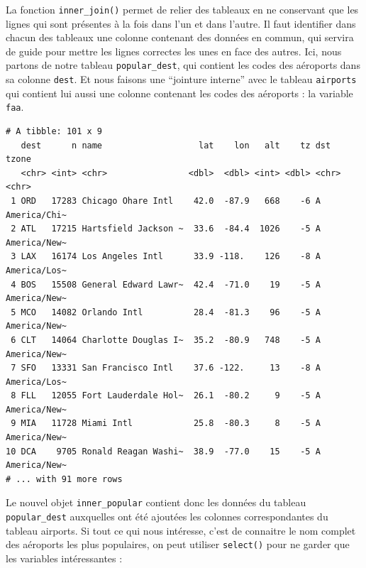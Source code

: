 \documentclass[a4paperpaper,]{article}
\newenvironment{Shaded}{\begin{snugshade}}{\end{snugshade}}
\newcommand{\KeywordTok}[1]{\textcolor[rgb]{0.13,0.29,0.53}{\textbf{#1}}}
\newcommand{\DataTypeTok}[1]{\textcolor[rgb]{0.13,0.29,0.53}{#1}}
\newcommand{\StringTok}[1]{\textcolor[rgb]{0.31,0.60,0.02}{#1}}
\newcommand{\OperatorTok}[1]{\textcolor[rgb]{0.81,0.36,0.00}{\textbf{#1}}}
\newcommand{\NormalTok}[1]{#1}
\theoremstyle{definition}
\theoremstyle{definition}
\theoremstyle{definition}
\theoremstyle{remark}
\begin{document}
La fonction \texttt{inner\_join()} permet de relier des tableaux en ne
conservant que les lignes qui sont présentes à la fois dans l'un et dans
l'autre. Il faut identifier dans chacun des tableaux une colonne
contenant des données en commun, qui servira de guide pour mettre les
lignes correctes les unes en face des autres. Ici, nous partons de notre
tableau \texttt{popular\_dest}, qui contient les codes des aéroports
dans sa colonne \texttt{dest}. Et nous faisons une ``jointure interne''
avec le tableau \texttt{airports} qui contient lui aussi une colonne
contenant les codes des aéroports : la variable \texttt{faa}.

\begin{Shaded}
\end{Shaded}

\begin{verbatim}
# A tibble: 101 x 9
   dest      n name                   lat    lon   alt    tz dst   tzone       
   <chr> <int> <chr>                <dbl>  <dbl> <int> <dbl> <chr> <chr>       
 1 ORD   17283 Chicago Ohare Intl    42.0  -87.9   668    -6 A     America/Chi~
 2 ATL   17215 Hartsfield Jackson ~  33.6  -84.4  1026    -5 A     America/New~
 3 LAX   16174 Los Angeles Intl      33.9 -118.    126    -8 A     America/Los~
 4 BOS   15508 General Edward Lawr~  42.4  -71.0    19    -5 A     America/New~
 5 MCO   14082 Orlando Intl          28.4  -81.3    96    -5 A     America/New~
 6 CLT   14064 Charlotte Douglas I~  35.2  -80.9   748    -5 A     America/New~
 7 SFO   13331 San Francisco Intl    37.6 -122.     13    -8 A     America/Los~
 8 FLL   12055 Fort Lauderdale Hol~  26.1  -80.2     9    -5 A     America/New~
 9 MIA   11728 Miami Intl            25.8  -80.3     8    -5 A     America/New~
10 DCA    9705 Ronald Reagan Washi~  38.9  -77.0    15    -5 A     America/New~
# ... with 91 more rows
\end{verbatim}

Le nouvel objet \texttt{inner\_popular} contient donc les données du
tableau \texttt{popular\_dest} auxquelles ont été ajoutées les colonnes
correspondantes du tableau airports. Si tout ce qui nous intéresse,
c'est de connaitre le nom complet des aéroports les plus populaires, on
peut utiliser \texttt{select()} pour ne garder que les variables
intéressantes :
\end{document}
